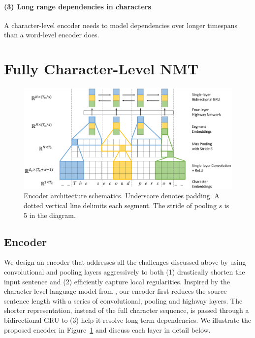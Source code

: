 \documentclass[11pt,letterpaper]{article}
\newcommand{\nrr}{\color{black}}
\begin{document}
    \paragraph{(3) Long range dependencies in characters} A character-level encoder needs to model dependencies over longer timespans than a word-level encoder does.
    

\section{Fully Character-Level NMT}\label{sec:model}

    \begin{figure}[t]
    \centering
    \includegraphics[width=13cm]{model7.pdf}
    \caption{Encoder architecture schematics. Underscore denotes padding. A dotted vertical line delimits each segment. {\nrr The stride of pooling $s$ is 5 in the diagram.} }
    \label{figure:encoder}
    \end{figure}

    \subsection{Encoder}

    We design an encoder that addresses all the challenges discussed above by using convolutional and pooling layers aggressively to both (1) drastically shorten the input sentence and (2) efficiently capture local regularities. Inspired by the character-level language model from \cite{Kim:15}, our encoder first reduces the source sentence length with a series of convolutional, pooling and highway layers. The shorter representation, instead of the full character sequence, is passed through a bidirectional GRU to (3) help it resolve long term dependencies. We illustrate the proposed encoder in Figure~\ref{figure:encoder} and discuss each layer in detail below. \\
    
\end{document}
